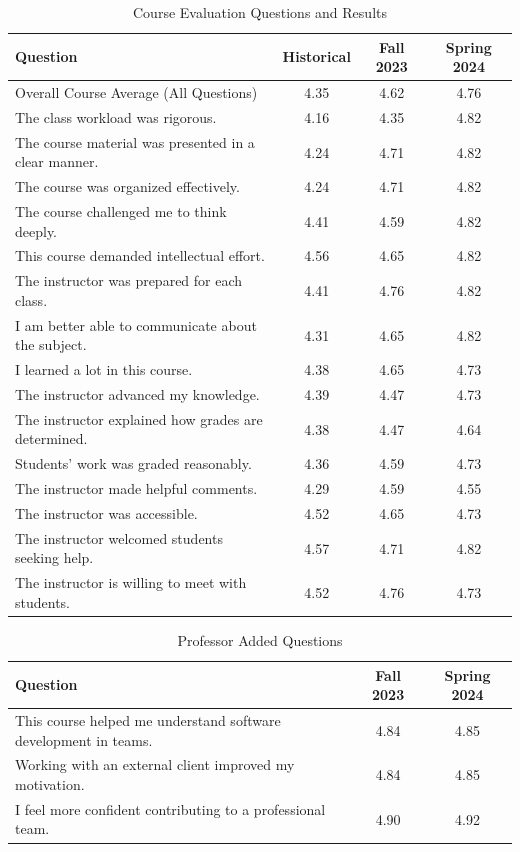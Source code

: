 \documentclass{article}
\begin{document}
\begin{table}[ht]
  \centering
  \tiny
\caption{Course Evaluation Questions and Results}
\label{tab:evals}
\begin{tabular}{lccc}
\hline
\textbf{Question} & \textbf{Historical} & \textbf{Fall 2023} & \textbf{Spring 2024} \\
\hline
Overall Course Average (All Questions) & 4.35 & 4.62 & 4.76 \\
The class workload was rigorous. & 4.16 & 4.35 & 4.82 \\
The course material was presented in a clear manner. & 4.24 & 4.71 & 4.82 \\
The course was organized effectively. & 4.24 & 4.71 & 4.82 \\
The course challenged me to think deeply. & 4.41 & 4.59 & 4.82 \\
This course demanded intellectual effort. & 4.56 & 4.65 & 4.82 \\
The instructor was prepared for each class. & 4.41 & 4.76 & 4.82 \\
I am better able to communicate about the subject. & 4.31 & 4.65 & 4.82 \\
I learned a lot in this course. & 4.38 & 4.65 & 4.73 \\
The instructor advanced my knowledge. & 4.39 & 4.47 & 4.73 \\
The instructor explained how grades are determined. & 4.38 & 4.47 & 4.64 \\
Students' work was graded reasonably. & 4.36 & 4.59 & 4.73 \\
The instructor made helpful comments. & 4.29 & 4.59 & 4.55 \\
The instructor was accessible. & 4.52 & 4.65 & 4.73 \\
The instructor welcomed students seeking help. & 4.57 & 4.71 & 4.82 \\
The instructor is willing to meet with students. & 4.52 & 4.76 & 4.73 \\
\hline
\end{tabular}
\end{table}

\begin{table}[ht]
  \centering
  \tiny
\caption{Professor Added Questions}
\label{tab:profquestions}
\begin{tabular}{lcc}
\hline
\textbf{Question} & \textbf{Fall 2023} & \textbf{Spring 2024} \\
\hline
This course helped me understand software development in teams. & 4.84 & 4.85 \\
Working with an external client improved my motivation. & 4.84 & 4.85 \\
I feel more confident contributing to a professional team. & 4.90 & 4.92 \\
\hline
\end{tabular}
\end{table}
\end{document}
